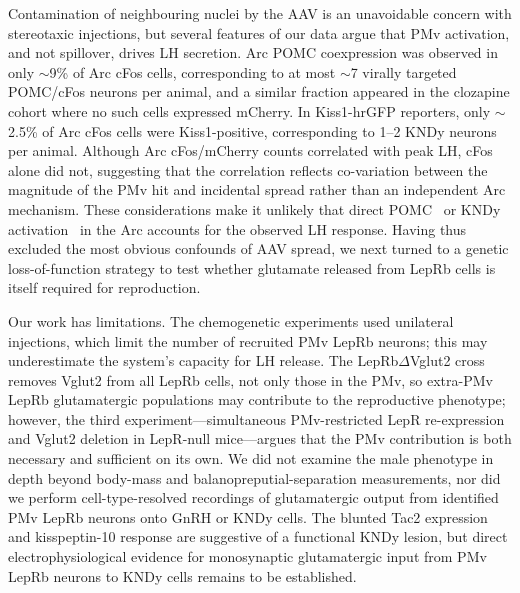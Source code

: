\documentclass[11pt]{article}
\begin{document}
Contamination of neighbouring nuclei by the AAV is an unavoidable concern with stereotaxic injections, but several features of our data argue that PMv activation, and not spillover, drives LH secretion. Arc POMC coexpression was observed in only $\sim$9\% of Arc cFos cells, corresponding to at most $\sim$7 virally targeted POMC/cFos neurons per animal, and a similar fraction appeared in the clozapine cohort where no such cells expressed mCherry. In Kiss1-hrGFP reporters, only $\sim$2.5\% of Arc cFos cells were Kiss1-positive, corresponding to 1--2 KNDy neurons per animal. Although Arc cFos/mCherry counts correlated with peak LH, cFos alone did not, suggesting that the correlation reflects co-variation between the magnitude of the PMv hit and incidental spread rather than an independent Arc mechanism. These considerations make it unlikely that direct POMC~\citep{manfredilozano2016defining,berglund2012direct} or KNDy activation~\citep{cravo2011kiss1} in the Arc accounts for the observed LH response. Having thus excluded the most obvious confounds of AAV spread, we next turned to a genetic loss-of-function strategy to test whether glutamate released from LepRb cells is itself required for reproduction.

Our work has limitations. The chemogenetic experiments used unilateral injections, which limit the number of recruited PMv LepRb neurons; this may underestimate the system's capacity for LH release. The LepRb$\Delta$Vglut2 cross removes Vglut2 from all LepRb cells, not only those in the PMv, so extra-PMv LepRb glutamatergic populations may contribute to the reproductive phenotype; however, the third experiment---simultaneous PMv-restricted LepR re-expression and Vglut2 deletion in LepR-null mice---argues that the PMv contribution is both necessary and sufficient on its own. We did not examine the male phenotype in depth beyond body-mass and balanopreputial-separation measurements, nor did we perform cell-type-resolved recordings of glutamatergic output from identified PMv LepRb neurons onto GnRH or KNDy cells. The blunted Tac2 expression and kisspeptin-10 response are suggestive of a functional KNDy lesion, but direct electrophysiological evidence for monosynaptic glutamatergic input from PMv LepRb neurons to KNDy cells remains to be established.
\end{document}
